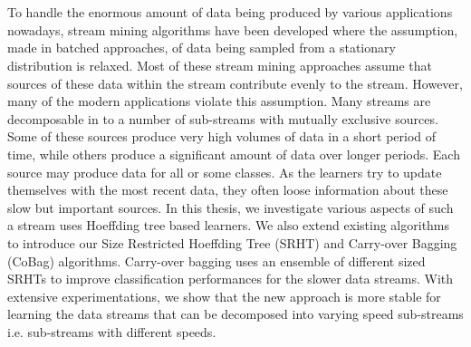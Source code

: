 \chapter{\abstractname}
To handle the enormous amount of data being produced by various applications nowadays, stream mining algorithms have been developed where the assumption, made in batched approaches, of data being sampled from a stationary distribution is relaxed.
Most of these stream mining approaches assume that sources of these data within the stream contribute evenly to the stream.
However, many of the modern applications violate this assumption. Many streams are decomposable in to a number of sub-streams with mutually exclusive sources. Some of these sources produce very high volumes of data in a short period of time, while others produce a significant amount of data over longer periods. Each source may produce data for all or some classes.
As the learners try to update themselves with the most recent data, they often loose information about these slow but important sources.
In this thesis, we investigate various aspects of such a stream uses Hoeffding tree based learners. We also extend existing algorithms to introduce our Size Restricted Hoeffding Tree (SRHT) and Carry-over Bagging (CoBag) algorithms. Carry-over bagging uses an ensemble of different sized SRHTs to improve classification performances for the slower data streams. With extensive experimentations, we show that the new approach is more stable for learning the data streams that can be decomposed into varying speed sub-streams i.e. sub-streams with different speeds.

